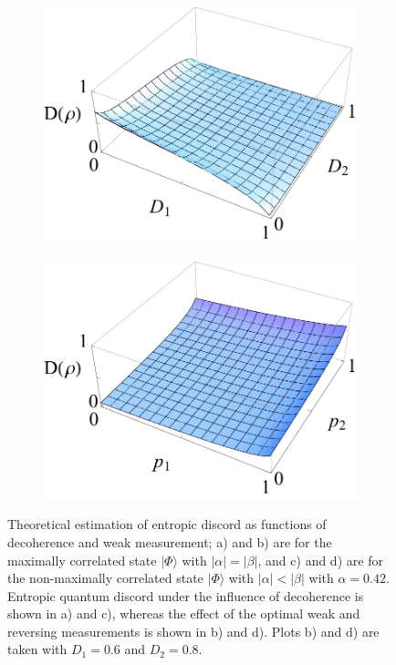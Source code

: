 \documentclass[%
 reprint,
 amsmath,amssymb,
 aps,
]{revtex4-1}
\begin{document}
\begin{figure}
\begin{subfigure}[b]{0.23\textwidth}
                \includegraphics[width=\textwidth]{041D}
                \caption{}
                \label{fig:A3}
        \end{subfigure}
        \begin{subfigure}[b]{0.23\textwidth}
                \includegraphics[width=\textwidth]{041W}
                \caption{}
                \label{fig:A4}
        \end{subfigure}
        \caption{Theoretical estimation of entropic discord as functions of decoherence and weak measurement; a) and b) are for the maximally correlated state $|\Phi\rangle$ with $|\alpha|=|\beta|$, and c) and d) are for the non-maximally correlated state $|\Phi\rangle$ with $|\alpha| < |\beta|$ with $\alpha=0.42$. Entropic quantum discord under the influence of decoherence is shown in a) and c), whereas the effect of the optimal weak and reversing measurements is shown in b) and d). Plots b) and d) are taken with $D_1 = 0.6$ and $D_2 = 0.8$.}\label{fig:A5}
\end{figure}
\end{document}
